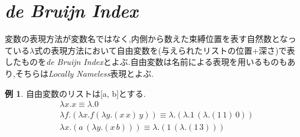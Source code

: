 \documentclass[a4j,10pt]{jsarticle}
\theoremstyle{definition}
\newtheorem*{example*}{例}
\begin{document}
\section{\sl \textbf{de Bruijn Index}}
変数の表現方法が変数名ではなく,内側から数えた束縛位置を表す自然数となっている\(\lambda\)式の表現方法において自由変数を(与えられたリストの位置+深さ)で表したものを{\sl de Bruijn Index}とよぶ.自由変数は名前による表現を用いるものもあり,そちらは{\sl Locally Nameless}表現とよぶ.
\begin{example*}
自由変数のリストは[a, b]とする.
\begin{align}
& \lambda x. x \equiv \lambda. 0\\
& \lambda f. (\lambda x. f (\lambda y. (x\, x)\, y)) \equiv \lambda . (\lambda. 1\, (\lambda . (1\, 1)\, 0))\\
& \lambda x. (a\, (\lambda y. (x\, b))) \equiv \lambda .(1\, (\lambda. (1\, 3)))
\end{align}
\end{example*}
\end{document}
